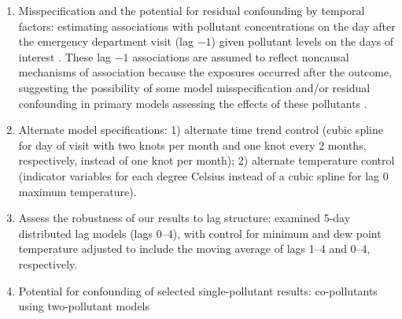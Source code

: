 \documentclass{article}
\begin{document}
\begin{itemize}
{        \begin{enumerate}
            \item Misspecification and the potential for residual confounding by temporal factors: estimating associations with pollutant concentrations on the day after the emergency department visit (lag $-1$) given pollutant levels on the days of interest \citep{flanders2011method}. These lag $-1$ associations are assumed to reflect noncausal mechanisms of association because the exposures occurred after the outcome, suggesting the possibility of some model misspecification and/or residual confounding in primary models assessing the effects of these pollutants \citep{flanders2011method}.
            \item Alternate model specifications: 1) alternate time trend control (cubic spline for day of visit with two knots per month and one knot every 2 months, respectively, instead of one knot per month); 2) alternate temperature control (indicator variables for each degree Celsius instead of a cubic spline for lag 0 maximum temperature).
            \item Assess the robustness of our results to lag structure: examined 5-day distributed lag models (lags 0--4), with control for minimum and dew point temperature adjusted to include the moving average of lags 1--4 and 0--4, respectively.
            \item Potential for confounding of selected single-pollutant results: co-pollutants using two-pollutant models
        \end{enumerate}
    }
\end{itemize}
\end{document}
